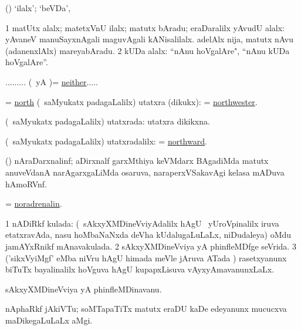 \bentry
{}
\gl{\kirxvi}
\bmng
(\AmA) `ilalx'; `beVDa', 
\emng
\eentry

\bentry
{}
\gl{\saMavayx}
\bmng
\bnum
\num{1} matUtx alalx; matetxVnU ilalx; matutx bAradu; eraDaralilx yAvudU alalx:  yAvaneV manuSayxnAgali maguvAgali kANisalilalx.  adelAlx nija, matutx nAvu (adanenxlAlx) mareyabAradu. 
\num{2} kUDa alalx:  ``nAnu hoVgalAre", ``nAnu kUDa hoVgalAre''. 
\enum
\emng

\noindent
\gl{\pagu}
\bmng
{}......... (\kAparx\ yA \pArxparx)= \hyperlink{neither(1)}{neither}..... 
\emng
\eentry

\bentry
{}
\gl{\nA}
\bmng
 = \hyperlink{north(1)}{north} (\kanmu\ saMyukatx padagaLalilx) utatxra (dikukx):  = \hyperlink{northwester}{northwester}. 
\emng
\eentry

\bentry
{}
\gl{\gu}
\bmng
(\kanmu\ saMyukatx padagaLalilx) utatxrada: utatxra dikikxna. 
\emng
\eentry

\bentry
{}
\gl{\kirxvi}
\bmng
(\kanmu\ saMyukatx padagaLalilx) utatxradalilx:  = \hyperlink{northward(1)}{northward}. 
\emng
\eentry

\bentry
{}
\gl{\nA}
\bmng
(\jiVra) nAraDarxnalinf; aDirxnalf garxMthiya keVMdarx BAgadiMda matutx anuveVdanA narAgarxgaLiMda osaruva, naraperxVSakavAgi kelasa mADuva hAmoRVnf. 
\emng
\eentry

\bentry
{}
\gl{\nA}
\bmng
= \hyperlink{noradrenalin}{noradrenalin}. 
\emng
\eentry

\bentry
{}
\gl{\gu}
\bmng
\bnum
\num{1} nADiRkf kulada: (\kanmu\ sAkxyXMDineVviyAdalilx hAgU \kanu\ yUroVpinalilx iruva etatxravAda, nasu hoMbaNaNxda deVha kUdalugaLuLaLx, niDudaleya) oMdu jamAYxRnikf mAnavakulada. 
\num{2} sAkxyXMDineVviya yA phinfleMDfge seVrida. 
\num{3} ('sikxVyiMgf' eMba niVru hAgU himada meVle jAruva ATada \vi) rasetxyanunx biTuTx bayalinalilx hoVguva hAgU kupapxLisuva vAyxyAmavanunxLaLx. 
\enum
\emng
\eentry

\bentry
{}
\gl{\nA}
\bmng
sAkxyXMDineVviya yA phinfleMDinavanu. 
\emng
\eentry

\bentry
{}
\gl{\nA}
\bmng
nAphaRkf jAkiVTu; soMTapaTiTx matutx eraDU kaDe edeyanunx mucucxva maDikegaLuLaLx aMgi.  
\emng
\eentry

